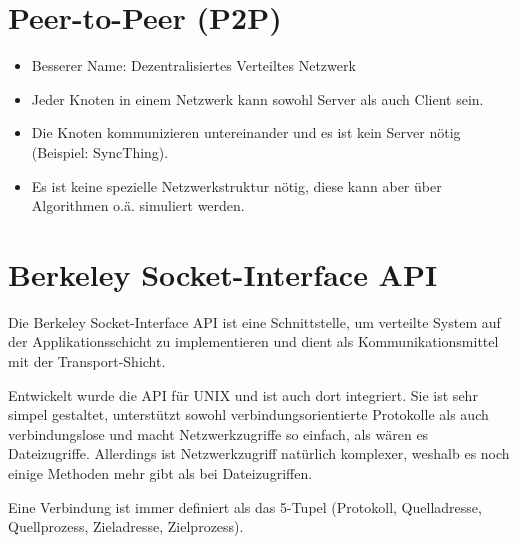 \documentclass[a4paper, 11pt, accentcolor = tud3b]{tudreport}
\begin{document}
        \section{Peer-to-Peer (P2P)}
            \begin{itemize}
            	\item Besserer Name: Dezentralisiertes Verteiltes Netzwerk
            	\item Jeder Knoten in einem Netzwerk kann sowohl Server als auch Client sein.
            	\item Die Knoten kommunizieren untereinander und es ist kein Server nötig (Beispiel: SyncThing).
            	\item Es ist keine spezielle Netzwerkstruktur nötig, diese kann aber über Algorithmen o.ä. simuliert werden.
            \end{itemize}

        \section{Berkeley Socket-Interface API}
            Die Berkeley Socket-Interface API ist eine Schnittstelle, um verteilte System auf der Applikationsschicht zu implementieren und dient als Kommunikationsmittel mit der Transport-Shicht.
            
            Entwickelt wurde die API für UNIX und ist auch dort integriert. Sie ist sehr simpel gestaltet, unterstützt sowohl verbindungsorientierte Protokolle als auch verbindungslose und macht Netzwerkzugriffe so einfach, als wären es Dateizugriffe. Allerdings ist Netzwerkzugriff natürlich komplexer, weshalb es noch einige Methoden mehr gibt als bei Dateizugriffen.
            
            Eine Verbindung ist immer definiert als das 5-Tupel (Protokoll, Quelladresse, Quellprozess, Zieladresse, Zielprozess).
\end{document}
